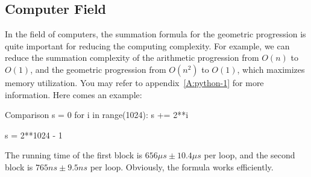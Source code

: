 \subsection{Computer Field}
In the field of computers, the summation formula for the geometric progression is quite important for reducing the computing complexity. For example, we can reduce the summation complexity of the arithmetic progression from $O(n)$ to $O(1)$, and the geometric progression from $O(n^2)$ to $O(1)$, which maximizes memory utilization. You may refer to appendix~\ref{A:python-1} for more information. Here comes an example:
\begin{pylist}{Comparison}
s = 0
for i in range(1024):
    s += 2**i

s = 2**1024 - 1
\end{pylist}

The running time of the first block is $656 \mu s ± 10.4\mu s$ per loop, and the second block is $765 ns ± 9.5 ns$ per loop. Obviously, the formula works efficiently.
